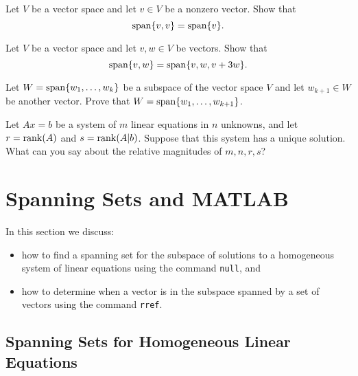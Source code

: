 \documentclass{ximera}
\begin{document}
\begin{exercise} \label{c5.2.8a}
Let $V$ be a vector space and let $v\in V$ be a nonzero vector.  Show that
\[
{\rm span}\{v,v\}={\rm span}\{v\}.
\]
\end{exercise}
\begin{exercise} \label{c5.2.8b}
Let $V$ be a vector space and let $v,w\in V$ be vectors.  Show that
\[
{\rm span}\{v,w\}={\rm span}\{v,w,v+3w\}.
\]
\end{exercise}

\begin{exercise} \label{c5.2.9}
Let $W={\rm span}\{w_1,\ldots,w_k\}$ be a subspace of the vector
space $V$ and let $w_{k+1}\in W$ be another vector.  Prove that
$W={\rm span}\{w_1,\ldots,w_{k+1}\}$.
\end{exercise}

\begin{exercise} \label{c5.2.10}
Let $Ax=b$ be a system of $m$ linear equations in $n$ unknowns,
and let $r={\rm rank}(A)$ and $s={\rm rank}(A|b)$.  Suppose that this system
has a unique solution.  What can you say about the relative
magnitudes of $m,n,r,s$?
\end{exercise}


\section{Spanning Sets and MATLAB} \label{S:5.3}

In this section we discuss:
\begin{itemize}
\item	how to find a spanning set for the subspace of solutions to a
homogeneous system of linear equations using the \Matlab command {\tt null},
and
\item	how to determine when a vector is in the subspace spanned by a
set of vectors using the \Matlab command {\tt rref}.
\end{itemize}

\subsection*{Spanning Sets for Homogeneous Linear Equations}
\end{document}
